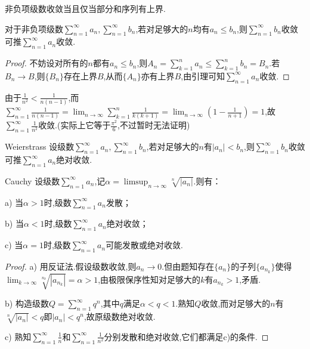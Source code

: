 \begin{lemma}{}
	非负项级数收敛当且仅当部分和序列有上界.
\end{lemma}

\begin{proposition}{}
	对于非负项级数$\sum_{n=1}^{\infty} a_n,\sum_{n=1}^{\infty} b_n$,若对足够大的$n$均有$a_n \leq b_n$,则$\sum_{n=1}^{\infty} b_n$收敛可推$\sum_{n=1}^{\infty} a_n$收敛.
\end{proposition}
\begin{proof}
	不妨设对所有的$n$都有$a_n \leq b_n$,则$A_n = \sum_{k=1}^{n} a_n \leq \sum_{k=1}^n b_n = B_n$.若$B_n \to B$,则$\{ B_n \}$存在上界$B$,从而$\{ A_n \}$亦有上界$B$,由引理可知$\sum_{n=1}^{\infty} a_n$收敛.
\end{proof}

\begin{example}
	由于$\frac{1}{n^2}<\frac{1}{n(n-1)}$,而$\sum_{n=1}^{\infty}\frac{1}{n(n-1)} = \lim_{n\to \infty} \sum_{k=1}^{n} \frac{1}{k(k+1)} = \lim_{n\to \infty} (1-\frac{1}{n+1})=1$,故$\sum_{n=1}^{\infty} \frac{1}{n^2}$收敛.(实际上它等于$\frac{\pi ^2}{6}$,不过暂时无法证明)
\end{example}

\begin{corollary}{Weierstrass}
	设级数$\sum_{n=1}^{\infty} a_n,\sum_{n=1}^{\infty} b_n$,若对足够大的$n$有$|a_n|<b_n$,则$\sum_{n=1}^{\infty} b_n$收敛可推$\sum_{n=1}^{\infty} a_n$绝对收敛.
\end{corollary}

\begin{corollary}{Cauchy}
	设级数$\sum_{n=1}^{\infty} a_n$,记$\alpha = \limsup_{n\to \infty} \sqrt[n]{|a_n|}$.则有：
	
	a) 当$\alpha >1$时,级数$\sum_{n=1}^{\infty} a_n$发散；
	
	b) 当$\alpha <1$时,级数$\sum_{n=1}^{\infty} a_n$绝对收敛；
	
	c) 当$\alpha =1$时,级数$\sum_{n=1}^{\infty} a_n$可能发散或绝对收敛.
\end{corollary}
\begin{proof}
	a) 用反证法.假设级数收敛,则$a_n \to 0$.但由题知存在$\{ a_n \}$的子列$\{ a_{n_k} \}$使得$\lim_{k\to \infty} \sqrt[n_k]{|a_{n_k}|} = \alpha > 1$,由极限保序性知对足够大的$k$有$a_{n_k}>1$,矛盾.
	
	b) 构造级数$Q=\sum_{n=1}^{\infty} q^n$,其中$q$满足$\alpha < q <1$.熟知$Q$收敛,而对足够大的$n$有$\sqrt[n]{|a_n|}<q$即$|a_n|<q^n$,故原级数绝对收敛.
	
	c) 熟知$\sum_{n=1}^{\infty} \frac{1}{n}$和$\sum_{n=1}^{\infty} \frac{1}{n^2}$分别发散和绝对收敛,它们都满足c)的条件.
\end{proof}

